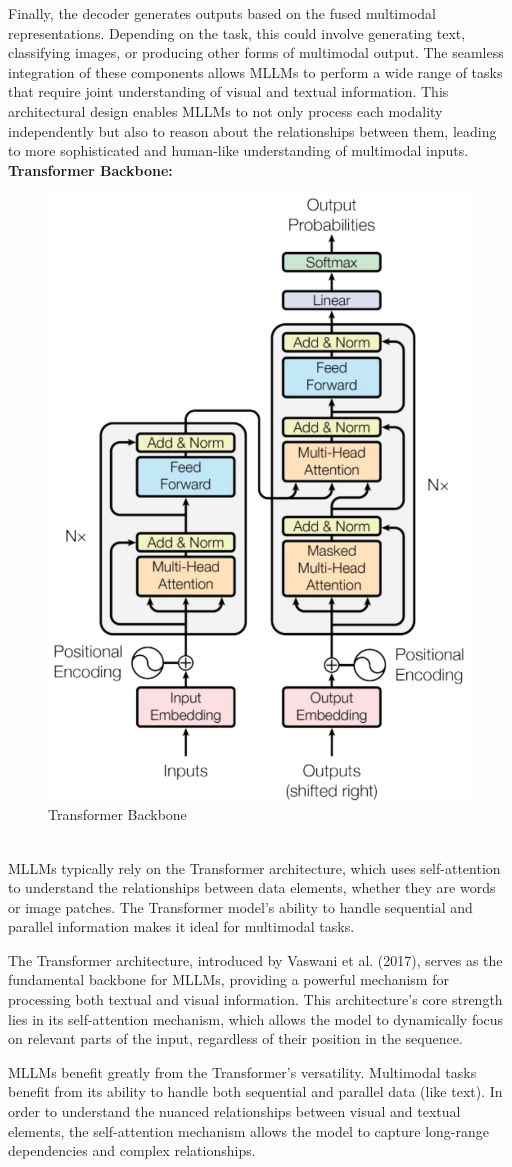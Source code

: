 Finally, the decoder generates outputs based on the fused multimodal representations. Depending on the task, this could involve generating text, classifying images, or producing other forms of multimodal output. The seamless integration of these components allows MLLMs to perform a wide range of tasks that require joint understanding of visual and textual information. This architectural design enables MLLMs to not only process each modality independently but also to reason about the relationships between them, leading to more sophisticated and human-like understanding of multimodal inputs.
\\
\textbf{Transformer Backbone:} 
\begin{figure}
    \centering
    \includegraphics[width=0.4\linewidth]{chapter2/transformer.pdf}
    \caption{Transformer Backbone}
    \label{fig:transformer}
\end{figure}
\\
MLLMs typically rely on the Transformer architecture, which uses self-attention to understand the relationships between data elements, whether they are words or image patches. The Transformer model’s ability to handle sequential and parallel information makes it ideal for multimodal tasks.

The Transformer architecture, introduced by Vaswani et al. (2017), serves as the fundamental backbone for MLLMs, providing a powerful mechanism for processing both textual and visual information. This architecture's core strength lies in its self-attention mechanism, which allows the model to dynamically focus on relevant parts of the input, regardless of their position in the sequence.

MLLMs benefit greatly from the Transformer's versatility. Multimodal tasks benefit from its ability to handle both sequential and parallel data (like text). In order to understand the nuanced relationships between visual and textual elements, the self-attention mechanism allows the model to capture long-range dependencies and complex relationships.

